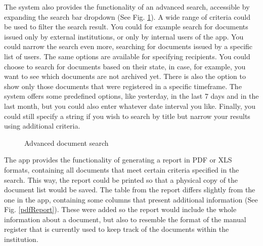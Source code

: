 The system also provides the functionality of an advanced search, accessible by expanding the search bar dropdown (See Fig. \ref{advancedSearch}). A wide range of criteria could be used to filter the search result. You could for example search for documents issued only by external institutions, or only by internal users of the app. You could narrow the search even more, searching for documents issued by a specific list of users. The same options are available for specifying recipients. You could choose to search for documents based on their state, in case, for example, you want to see which documents are not archived yet. There is also the option to show only those documents that were registered in a specific timeframe. The system offers some predefined options, like yesterday, in the last 7 days and in the last month, but you could also enter whatever date interval you like. Finally, you could still specify a string if you wish to search by title but narrow your results using additional criteria.

\begin{figure}[ht]
    \centering
    \qquad
    \caption{Advanced document search}
    \label{advancedSearch}
\end{figure}

The app provides the functionality of generating a report in PDF or XLS formats, containing all documents that meet certain criteria specified in the search. This way, the report could be printed so that a physical copy of the document list would be saved. The table from the report differs slightly from the one in the app, containing some columns that present additional information (See Fig. \ref{pdfReport}). These were added so the report would include the whole information about a document, but also to resemble the format of the manual register that is currently used to keep track of the documents within the institution.

